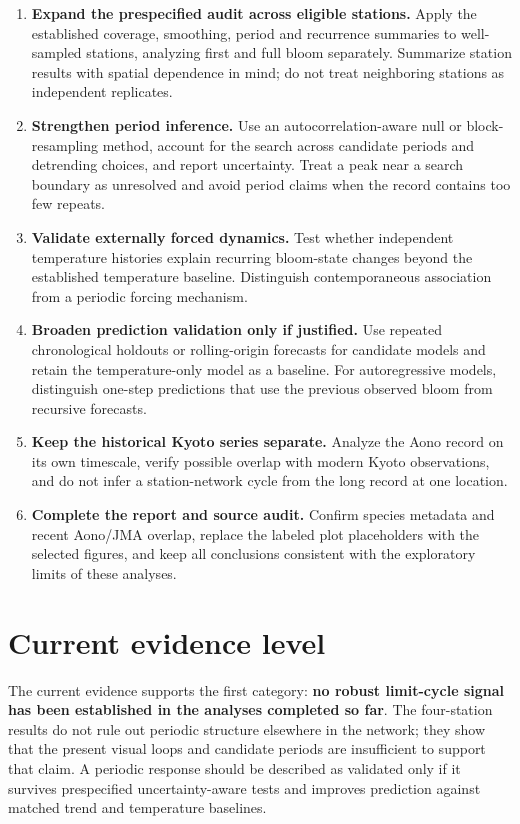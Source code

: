 \documentclass[11pt,a4paper]{article}
\begin{document}
\begin{enumerate}
  \item \textbf{Expand the prespecified audit across eligible stations.} Apply the established coverage, smoothing, period and recurrence summaries to well-sampled stations, analyzing first and full bloom separately. Summarize station results with spatial dependence in mind; do not treat neighboring stations as independent replicates.
  \item \textbf{Strengthen period inference.} Use an autocorrelation-aware null or block-resampling method, account for the search across candidate periods and detrending choices, and report uncertainty. Treat a peak near a search boundary as unresolved and avoid period claims when the record contains too few repeats.
  \item \textbf{Validate externally forced dynamics.} Test whether independent temperature histories explain recurring bloom-state changes beyond the established temperature baseline. Distinguish contemporaneous association from a periodic forcing mechanism.
  \item \textbf{Broaden prediction validation only if justified.} Use repeated chronological holdouts or rolling-origin forecasts for candidate models and retain the temperature-only model as a baseline. For autoregressive models, distinguish one-step predictions that use the previous observed bloom from recursive forecasts.
  \item \textbf{Keep the historical Kyoto series separate.} Analyze the Aono record on its own timescale, verify possible overlap with modern Kyoto observations, and do not infer a station-network cycle from the long record at one location.
  \item \textbf{Complete the report and source audit.} Confirm species metadata and recent Aono/JMA overlap, replace the labeled plot placeholders with the selected figures, and keep all conclusions consistent with the exploratory limits of these analyses.
\end{enumerate}

\section*{Current evidence level}

The current evidence supports the first category: \textbf{no robust limit-cycle signal has been established in the analyses completed so far}. The four-station results do not rule out periodic structure elsewhere in the network; they show that the present visual loops and candidate periods are insufficient to support that claim. A periodic response should be described as validated only if it survives prespecified uncertainty-aware tests and improves prediction against matched trend and temperature baselines.
\end{document}
